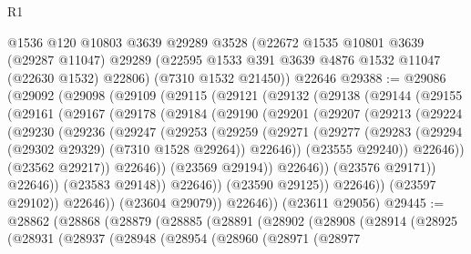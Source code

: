 \begin{lexlean}{R1}
\begin{coremodule}
    @1536
    @120
    @10803
    @3639
    @29289
    @3528
    (@22672
      @1535
      @10801
      @3639
      (@29287 @11047)
      @29289
      (@22595 @1533 @391 @3639 @4876 @1532 @11047 (@22630 @1532) @22806)
      (@7310 @1532 @21450))
    @22646
@29388 := @29086
    (@29092
      (@29098
        (@29109
          (@29115
            (@29121
              (@29132
                (@29138
                  (@29144
                    (@29155
                      (@29161
                        (@29167
                          (@29178
                            (@29184
                              (@29190
                                (@29201
                                  (@29207
                                    (@29213
                                      (@29224
                                        (@29230
                                          (@29236
                                            (@29247
                                              (@29253
                                                (@29259
                                                  (@29271
                                                    (@29277
                                                      (@29283
                                                        (@29294
                                                          (@29302 @29329)
                                                          (@7310 @1528 @29264))
                                                        @22646))
                                                    (@23555 @29240))
                                                  @22646))
                                              (@23562 @29217))
                                            @22646))
                                        (@23569 @29194))
                                      @22646))
                                  (@23576 @29171))
                                @22646))
                            (@23583 @29148))
                          @22646))
                      (@23590 @29125))
                    @22646))
                (@23597 @29102))
              @22646))
          (@23604 @29079))
        @22646))
    (@23611 @29056)
@29445 := @28862
    (@28868
      (@28879
        (@28885
          (@28891
            (@28902
              (@28908
                (@28914
                  (@28925
                    (@28931
                      (@28937
                        (@28948
                          (@28954
                            (@28960
                              (@28971
                                (@28977

\end{coremodule}
\end{lexlean}
